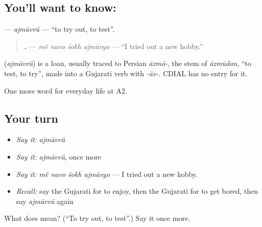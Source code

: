 \subsection*{You'll want to know: }
\textbf{} — \emph{ajmāvvũ} — \textquotedblleft{}to try out, to test\textquotedblright{}.

\begin{quote}
\textbf{   .} — \emph{mẽ navo śokh ajmāvyo} — \textquotedblleft{}I tried out a new hobby.\textquotedblright{}
\end{quote}

\begin{cousinweb}
\textbf{} (\emph{ajmāvvũ}) is a loan, usually traced to Persian \emph{āzmā-}, the stem of \emph{āzmūdan}, \textquotedblleft{}to test, to try\textquotedblright{}, made into a Gujarati verb with \emph{-āv-}. CDIAL has no entry for it.
\end{cousinweb}

\begin{grammarlens}[title={What you've built}]
One more word for everyday life at A2.
\end{grammarlens}

\subsection*{Your turn}
\begin{itemize}
\raggedright
  \item \emph{Say it:} \emph{ajmāvvũ}
  \item \emph{Say it:} \emph{ajmāvvũ}, once more
  \item \emph{Say it:} \emph{mẽ navo śokh ajmāvyo} — I tried out a new hobby.
  \item \emph{Recall:} say the Gujarati for to enjoy, then the Gujarati for to get bored, then say \emph{ajmāvvũ} again
\end{itemize}

\begin{tcolorbox}[breakable,colback=teal!4,colframe=teal!35!black,title={Before you move on}]
What does  mean? (\textquotedblleft{}To try out, to test\textquotedblright{}.) Say it once more.
\end{tcolorbox}

